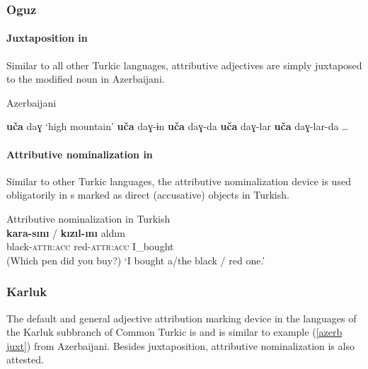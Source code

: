 \subsubsection{Oguz}
\paragraph*{Juxtaposition in }
Similar to all other Turkic languages, attributive adjectives are simply juxtaposed to the modified noun in Azerbaijani.
\begin{exe}
\settowidth{}
\ex
\label{azerb juxt}
{\rm Azerbaijani \citep[59–60]{siraliev-etal1971}}
\begin{xlist}
\ex	\textbf{uča} daɣ 		{\rm ‘high mountain’}	
\ex	\textbf{uča} daɣ-ɨn						
\ex	\textbf{uča} daɣ-da 						
\ex	\textbf{uča} daɣ-lar 						
\ex	\textbf{uča} daɣ-lar-da 					
\ex \dots
\end{xlist}
\end{exe}

\paragraph*{Attributive nominalization in }
\label{turkish synchr}
Similar to other Turkic languages, the attributive nominalization device is used obligatorily in s marked as direct (accusative) objects in Turkish.
\begin{exe}
\ex 
\label{turkish headless acc}	
{\rm Attributive nominalization in Turkish \citep[7]{benzing1993b}}\\ 
\gll	\textbf{kara-sını} / \textbf{kızıl-ını} aldım\\
 	black-\textsc{attr:acc} { } red-\textsc{attr:acc} I\_bought\\
\glt 	(Which pen did you buy?) ‘I bought a/the black / red one.’
\end{exe}
 
\subsubsection{Karluk}
The default and general adjective attribution marking device in the languages of the Karluk subbranch of Common Turkic is  and is similar to example (\ref{azerb juxt}) from Azerbaijani. Besides juxtaposition, attributive nominalization is also attested.

